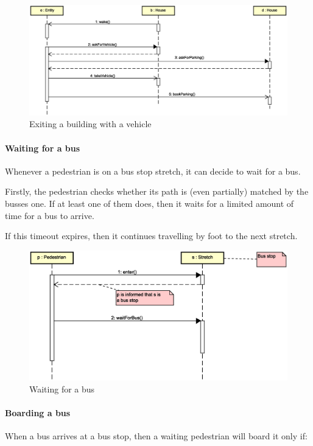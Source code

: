 \begin{figure}[H]
  \centering
  \includegraphics[width=\columnwidth,trim=1 0 0 0,clip]
    {sections/images/solution/going-out-vehicle.eps}
  \caption{Exiting a building with a vehicle}
  \label{fig:app-inter-vehicle}
\end{figure}

\paragraph{Waiting for a bus} 
Whenever a pedestrian is on a bus stop stretch, 
it can decide to wait for a bus.

Firstly, the pedestrian checks whether its path is (even partially) 
matched by the busses one.
If at least one of them does, then it waits for a limited amount of time for a bus to arrive.

If this timeout expires, then it continues travelling by foot to the next stretch.

\begin{figure}[H]
  \centering
  \includegraphics[width=\columnwidth,trim=1 0 2 0,clip]
    {sections/images/solution/bus-waiting.eps}
  \caption{Waiting for a bus}
  \label{fig:app-inter-wait-bus}
\end{figure}

\paragraph{Boarding a bus} When a bus arrives at a bus stop, then a waiting
pedestrian will board it only if:

